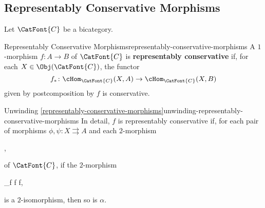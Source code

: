\subsection{Representably Conservative Morphisms}\label{subsection-representably-conservative-morphisms}
Let $\CatFont{C}$ be a bicategory.
\begin{definition}{Representably Conservative Morphisms}{representably-conservative-morphisms}%
    A $1$-morphism $f\colon A\to B$ of $\CatFont{C}$ is \textbf{representably conservative} if, for each $X\in\Obj(\CatFont{C})$, the functor
    \[
        f_{*}%
        \colon%
        \cHom_{\CatFont{C}}(X,A)%
        \to%
        \cHom_{\CatFont{C}}(X,B)%
    \]%
    given by postcomposition by $f$ is conservative.
\end{definition}
\begin{remark}{Unwinding \cref{representably-conservative-morphisms}}{unwinding-representably-conservative-morphisms}%
    In detail, $f$ is representably conservative if, for each pair of morphisms $\phi,\psi\colon X\rightrightarrows A$ and each $2$-morphism
    \begin{webcompile}
        \alpha%
        \colon%
        \phi%
        \Longrightarrow%
        \psi,%
        \quad%
    \end{webcompile}
    of $\CatFont{C}$, if the $2$-morphism
    \begin{webcompile}
        \id_{f}\twocirc\alpha%
        \colon%
        f\circ\phi%
        \Longrightarrow%
        f\circ\psi,%
        \quad%
    \end{webcompile}
    is a $2$-isomorphism, then so is $\alpha$.
\end{remark}
